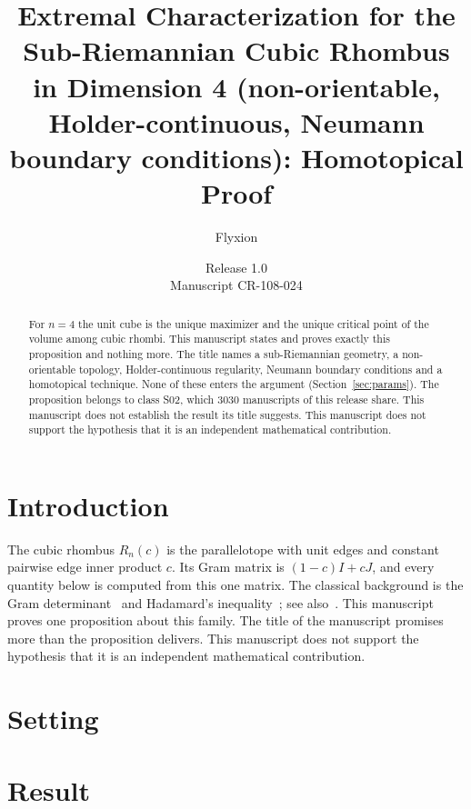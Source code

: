 \documentclass[11pt]{article}
\title{Extremal Characterization for the Sub-Riemannian Cubic Rhombus in Dimension 4 (non-orientable, Holder-continuous, Neumann boundary conditions): Homotopical Proof}
\author{Flyxion}
\date{Release 1.0\\ Manuscript CR-108-024}
\begin{document}
\maketitle
\begin{abstract}
For $n=4$ the unit cube is the unique maximizer and the unique critical point of the volume among cubic rhombi. This manuscript states and proves exactly this proposition and nothing more. The title names a sub-Riemannian geometry, a non-orientable topology, Holder-continuous regularity, Neumann boundary conditions and a homotopical technique. None of these enters the argument (Section~\ref{sec:params}). The proposition belongs to class S02, which 3030 manuscripts of this release share. This manuscript does not establish the result its title suggests. This manuscript does not support the hypothesis that it is an independent mathematical contribution.
\end{abstract}

\section{Introduction}
The cubic rhombus $R_n(c)$ is the parallelotope with unit edges and constant pairwise edge inner product $c$. Its Gram matrix is $(1-c)I+cJ$, and every quantity below is computed from this one matrix. The classical background is the Gram determinant~\cite{gram} and Hadamard's inequality~\cite{hadamard}; see also~\cite{hj}.
This manuscript proves one proposition about this family. The title of the manuscript promises more than the proposition delivers. This manuscript does not support the hypothesis that it is an independent mathematical contribution.

\section{Setting}


\section{Result}

\end{document}
